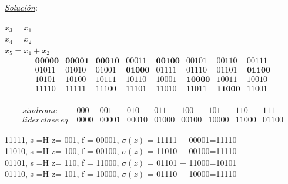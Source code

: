 \documentclass{beamer}
\theoremstyle{plain}
\theoremstyle{example}
\theoremstyle{example}
\begin{document}
\begin{frame}  \footnotesize

 \textit{\underline{Solución}}:\\ 
\vspace{0.3cm}

$x_3=x_1$\\
$x_4=x_2$\\
$x_5=x_1+x_2$\\

\[
  \begin{array}{lcccccccc}
\textbf{00000}		& \textbf{00001}	& 	\textbf{00010}	& 	00011			& 		\textbf{00100}		& 00101		& 			00110		& 		00111\\
01011		& 01010					& 01001			& 		\textbf{01000}	& 	01111			& 		01110	& 				01101	& 		\textbf{01100}\\
10101		& 			10100			& 		10111		& 			10110			& 		10001		& 			\textbf{10000}	& 	10011	& 				10010\\
11110      & 			11111			& 		11100		& 			11101			& 		11010		& 			11011			& 		\textbf{11000}	& 	11001\\
	\end{array}
\]

\[
  \begin{array}{lcccccccc}
                   sindrome 				& 000 & 001	 	  & 010 	& 011		& 100     & 101	 	  & 110 	& 111\\ 
				   lider\, clase\, eq. & 0000 & 00001 & 00010 & 01000   & 00100 & 10000  & 11000 & 01100
	\end{array}
\]


\begin{center}
11111, s =H z= 001, f = 00001, $\sigma (z)$ = 11111 + 00001=11110\\
11010, s =H z= 100, f = 00100, $\sigma (z)$ = 11010 + 00100=11110\\
01101, s =H z= 110, f = 11000, $\sigma (z)$ = 01101 + 11000=10101\\
01110, s =H z= 101, f = 10000, $\sigma (z)$ = 01110 + 10000=11110\\
\end{center}

\end{frame} 




\end{document}
